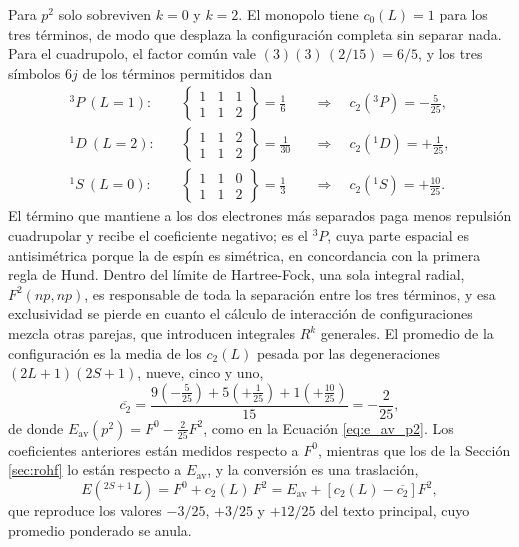 Para $p^2$ solo sobreviven $k = 0$ y $k = 2$. El monopolo tiene $c_0(L) = 1$ para los tres términos, de modo que desplaza la configuración completa sin separar nada. Para el cuadrupolo, el factor común vale $(3)(3)\,(2/15) = 6/5$, y los tres símbolos $6j$ de los términos permitidos dan
\begin{align}
    ^3P\ (L=1):&\quad \begin{Bmatrix} 1 & 1 & 1 \\ 1 & 1 & 2 \end{Bmatrix} = \frac{1}{6}
    &&\Longrightarrow\quad c_2(^3P) = -\frac{5}{25}, \label{eq:c2_3P}\\
    ^1D\ (L=2):&\quad \begin{Bmatrix} 1 & 1 & 2 \\ 1 & 1 & 2 \end{Bmatrix} = \frac{1}{30}
    &&\Longrightarrow\quad c_2(^1D) = +\frac{1}{25}, \label{eq:c2_1D}\\
    ^1S\ (L=0):&\quad \begin{Bmatrix} 1 & 1 & 0 \\ 1 & 1 & 2 \end{Bmatrix} = \frac{1}{3}
    &&\Longrightarrow\quad c_2(^1S) = +\frac{10}{25}. \label{eq:c2_1S}
\end{align}
El término que mantiene a los dos electrones más separados paga menos repulsión cuadrupolar y recibe el coeficiente negativo; es el $^3P$, cuya parte espacial es antisimétrica porque la de espín es simétrica, en concordancia con la primera regla de Hund. Dentro del límite de Hartree-Fock, una sola integral radial, $F^2(np,np)$, es responsable de toda la separación entre los tres términos, y esa exclusividad se pierde en cuanto el cálculo de interacción de configuraciones mezcla otras parejas, que introducen integrales $R^k$ generales. El promedio de la configuración es la media de los $c_2(L)$ pesada por las degeneraciones $(2L+1)(2S+1)$, nueve, cinco y uno,
\begin{equation}
    \label{eq:c2_promedio}
    \overline{c_2} = \frac{9\left(-\frac{5}{25}\right) + 5\left(+\frac{1}{25}\right) + 1\left(+\frac{10}{25}\right)}{15} = -\frac{2}{25},
\end{equation}
de donde $E_{\text{av}}(p^2) = F^0 - \frac{2}{25}F^2$, como en la Ecuación \eqref{eq:e_av_p2}. Los coeficientes anteriores están medidos respecto a $F^0$, mientras que los de la Sección \ref{sec:rohf} lo están respecto a $E_{\text{av}}$, y la conversión es una traslación,
\begin{equation}
    \label{eq:conversion_referencia}
    E(^{2S+1}L) = F^0 + c_2(L)\,F^2 = E_{\text{av}} + \left[c_2(L) - \overline{c_2}\right] F^2,
\end{equation}
que reproduce los valores $-3/25$, $+3/25$ y $+12/25$ del texto principal, cuyo promedio ponderado se anula.

